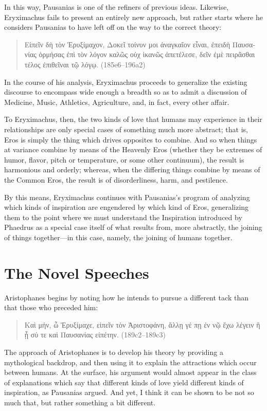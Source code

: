 In this way, Pausanias is one of the refiners of previous ideas.
Likewise, Eryximachus fails to present an entirely new approach, but
rather starts where he considers Pausanias to have left off on the way
to the correct theory:

\begin{quote}
\textgreek{Εἰπεῖν δὴ τὸν Ἐρυξίμαχον, Δοκεῖ τοίνυν μοι ἀναγκαῖον εἶναι,
ἐπειδὴ Παυσανίας ὁρμήσας ἐπὶ τὸν λόγον καλῶς οὐχ ἱκανῶς ἀπετέλεσε,
δεῖν ἐμὲ πειρᾶσθαι τέλος ἐπιθεῖναι τῷ λόγῳ.} (185e6--196a2)
\end{quote}

In the course of his analysis, Eryximachus proceeds to generalize the
existing discourse to encompass wide enough a breadth so as to admit a
discussion of Medicine, Music, Athletics, Agriculture, and, in fact,
every other affair.

To Eryximachus, then, the two kinds of love that humans may experience
in their relationships are only special cases of something much more
abstract; that is, Eros is simply the thing which drives opposites to
combine. And so when things at variance combine by means of the Heavenly
Eros (whether they be extremes of humor, flavor, pitch or temperature,
or some other continuum), the result is harmonious and orderly; whereas,
when the differing things combine by means of the Common Eros, the
result is of disorderliness, harm, and pestilence.

By this means, Eryximachus continues with Pausanias's program of
analyzing which kinds of inspiration are engendered by which kind of
Eros, generalizing them to the point where we must understand the
Inspiration introduced by Phaedrus as a special case itself of what
results from, more abstractly, the joining of things together---in this
case, namely, the joining of humans together.

\section{The Novel Speeches}

Aristophanes begins by noting how he intends to pursue a different tack
than that those who preceded him:

\begin{quote}
\textgreek{Καὶ μήν, ὦ Ἐρυξίμαχε, εἰπεῖν τὸν Ἀριστοφάνη, ἄλλῃ γέ πῃ ἐν
νῷ ἔχω λέγειν ἢ  ᾗ σύ τε καὶ Παυσανίας εἰπέτην.} (189c2--189c3)
\end{quote}

The approach of Aristophanes is to develop his theory by providing a
mythological backdrop, and then using it to explain the attractions
which occur between humans. At the surface, his argument would almost
appear in the class of explanations which say that different kinds of
love yield different kinds of inspiration, as Pausanias argued. And yet,
I think it can be shown to be not so much that, but rather something a
bit different.

